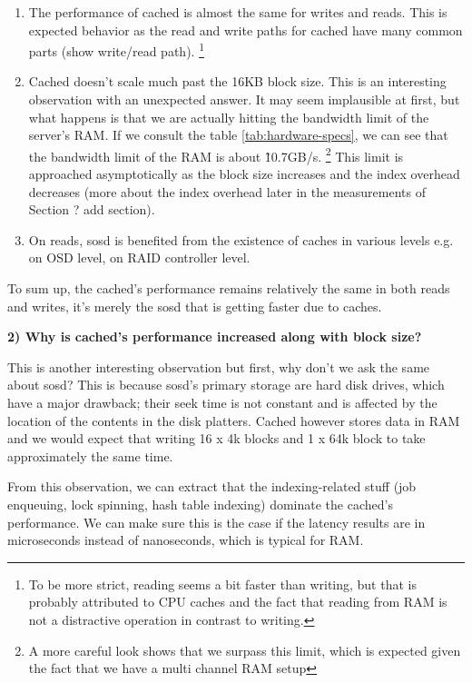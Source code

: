 \begin{enumerate}
	\item The performance of cached is almost the same for writes and 
		reads.  This is expected behavior as the read and write paths 
		for cached have many common parts (\fixme show write/read 
		path).
		\footnote{To be more strict, reading seems a bit faster than 
			writing, but that is probably attributed to CPU caches 
			and the fact that reading from RAM is not a distractive 
			operation in contrast to writing.}
	\item Cached doesn't scale much past the 16KB block size. This is an 
		interesting observation with an unexpected answer. It may seem 
		implausible at first, but what happens is that we are actually 
		hitting the bandwidth limit of the server's RAM. If we consult 
		the table \ref{tab:hardware-specs}, we can see that the 
		bandwidth limit of the RAM is about \~10.7GB/s.
		\footnote{A more careful look shows that we surpass this limit, 
			which is expected given the fact that we have a multi 
			channel RAM setup}
		This limit is approached asymptotically as the block size 
		increases and the index overhead decreases (more about the 
		index overhead later in the measurements of Section ? \fixme 
		add section).
	\item On reads, sosd is benefited from the existence of caches in 
		various levels e.g. on OSD level, on RAID controller level.
\end{enumerate}

To sum up, the cached's performance remains relatively the same in both reads 
and writes, it's merely the sosd that is getting faster due to caches. 

\textbf{2) Why is cached's performance increased along with block size?}

This is another interesting observation but first, why don't we ask the same 
about sosd? This is because sosd's primary storage are hard disk drives, which 
have a major drawback; their seek time is not constant and is affected by the 
location of the contents in the disk platters. Cached however stores data in 
RAM and we would expect that writing 16 x 4k blocks and 1 x 64k block to take 
approximately the same time.

From this observation, we can extract that the indexing-related stuff (job 
enqueuing, lock spinning, hash table indexing) dominate the cached's 
performance. We can make sure this is the case if the latency results are in
microseconds instead of nanoseconds, which is typical for RAM.

